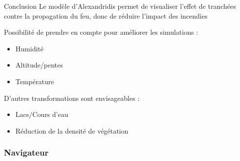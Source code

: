 \documentclass{beamer}
\begin{document}
\begin{frame}{Conclusion \hyperlink{jump}{\beamerbutton{ }} \hypertarget{17}{\beamerbutton{ }}}
    Le modèle d'Alexandridis permet de visualiser l'effet de tranchées contre la propagation du feu, donc de réduire l'impact des incendies
    
    Possibilité de prendre en compte pour améliorer les simulations :
    \begin{itemize}
        \item Humidité
        \item Altitude/pentes
        \item Température
    \end{itemize}

    D'autres transformations sont envisageables :
    \begin{itemize}
        \item Lacs/Cours d'eau
        \item Réduction de la densité de végétation
    \end{itemize}
\end{frame}

\begin{frame}
    \frametitle{Navigateur \hypertarget{jump}{\beamerbutton{ }}}
    
    \hyperlink{1}{} \\
    \hyperlink{2}{} \\
    \hyperlink{3}{} \\
    \hyperlink{4}{} \\
    \hyperlink{5}{} \\
    \hyperlink{6}{} \\
    \hyperlink{7}{} \\
    \hyperlink{8}{} \\
    \hyperlink{9}{} \\
    \hyperlink{10}{} \\
    \hyperlink{11}{} \\
    \hyperlink{12}{} \\
    \hyperlink{13}{} \\
    \hyperlink{14}{} \\
    \hyperlink{15}{} \\
    \hyperlink{16}{} \\
    \hyperlink{17}{}
\end{frame}
\end{document}
